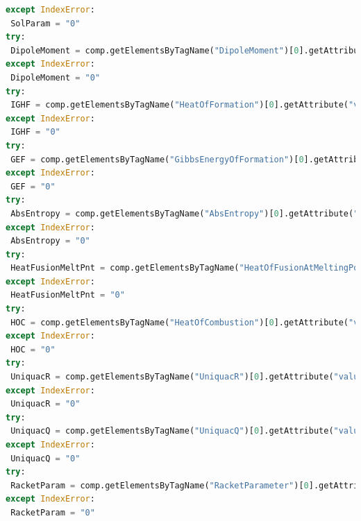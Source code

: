 \documentclass[12pt]{report}
\begin{document}
\begin{lstlisting}[language=Python]
except IndexError:
 SolParam = "0"
try:  
 DipoleMoment = comp.getElementsByTagName("DipoleMoment")[0].getAttribute("value")  
except IndexError:
 DipoleMoment = "0"
try:   
 IGHF = comp.getElementsByTagName("HeatOfFormation")[0].getAttribute("value")
except IndexError:
 IGHF = "0"
try:  
 GEF = comp.getElementsByTagName("GibbsEnergyOfFormation")[0].getAttribute("value")
except IndexError:
 GEF = "0"
try:   
 AbsEntropy = comp.getElementsByTagName("AbsEntropy")[0].getAttribute("value")
except IndexError:
 AbsEntropy = "0"
try:  
 HeatFusionMeltPnt = comp.getElementsByTagName("HeatOfFusionAtMeltingPoint")[0].getAttribute("value")
except IndexError:
 HeatFusionMeltPnt = "0"  
try:   
 HOC = comp.getElementsByTagName("HeatOfCombustion")[0].getAttribute("value")
except IndexError: 
 HOC = "0"
try:
 UniquacR = comp.getElementsByTagName("UniquacR")[0].getAttribute("value")
except IndexError:
 UniquacR = "0"
try:
 UniquacQ = comp.getElementsByTagName("UniquacQ")[0].getAttribute("value")
except IndexError:
 UniquacQ = "0"
try:
 RacketParam = comp.getElementsByTagName("RacketParameter")[0].getAttribute("value")
except IndexError:
 RacketParam = "0"



\end{lstlisting}
\end{document}
